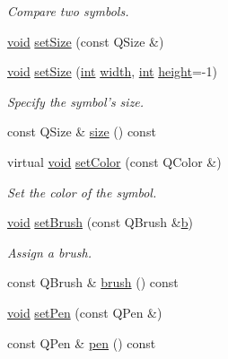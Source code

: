 \begin{DoxyCompactItemize}
\begin{DoxyCompactList}\small\item\em Compare two symbols. \end{DoxyCompactList}\item 
\hyperlink{group___u_a_v_objects_plugin_ga444cf2ff3f0ecbe028adce838d373f5c}{void} \hyperlink{class_qwt_symbol_a9fa391b34596f89256278254fa2ae3d8}{set\-Size} (const Q\-Size \&)
\item 
\hyperlink{group___u_a_v_objects_plugin_ga444cf2ff3f0ecbe028adce838d373f5c}{void} \hyperlink{class_qwt_symbol_afd5587cd1752594954ca6146f643acfb}{set\-Size} (\hyperlink{ioapi_8h_a787fa3cf048117ba7123753c1e74fcd6}{int} \hyperlink{glext_8h_a76aaa5c50746272e7d2de9aece921757}{width}, \hyperlink{ioapi_8h_a787fa3cf048117ba7123753c1e74fcd6}{int} \hyperlink{glext_8h_ae23e72c69f79d0aa647aa7929ef3f232}{height}=-\/1)
\begin{DoxyCompactList}\small\item\em Specify the symbol's size. \end{DoxyCompactList}\item 
const Q\-Size \& \hyperlink{class_qwt_symbol_a3aba8eed9fcd85f4a4799e63543a2398}{size} () const 
\item 
virtual \hyperlink{group___u_a_v_objects_plugin_ga444cf2ff3f0ecbe028adce838d373f5c}{void} \hyperlink{class_qwt_symbol_a046443d76371c92add79e1f360bf3134}{set\-Color} (const Q\-Color \&)
\begin{DoxyCompactList}\small\item\em Set the color of the symbol. \end{DoxyCompactList}\item 
\hyperlink{group___u_a_v_objects_plugin_ga444cf2ff3f0ecbe028adce838d373f5c}{void} \hyperlink{class_qwt_symbol_ae6aa7281d518bdd4adae8a37bbb5e09a}{set\-Brush} (const Q\-Brush \&\hyperlink{glext_8h_a6eba317e3cf44d6d26c04a5a8f197dcb}{b})
\begin{DoxyCompactList}\small\item\em Assign a brush. \end{DoxyCompactList}\item 
const Q\-Brush \& \hyperlink{class_qwt_symbol_a7260c1fa79009661cd0723e6c2b9ef87}{brush} () const 
\item 
\hyperlink{group___u_a_v_objects_plugin_ga444cf2ff3f0ecbe028adce838d373f5c}{void} \hyperlink{class_qwt_symbol_ac4d75a6a9f9ae7f8f1002c465d5bbcb6}{set\-Pen} (const Q\-Pen \&)
\item 
const Q\-Pen \& \hyperlink{class_qwt_symbol_a2fe55b71735bcaca3e931b65b9b1ed13}{pen} () const 

\end{DoxyCompactItemize}
